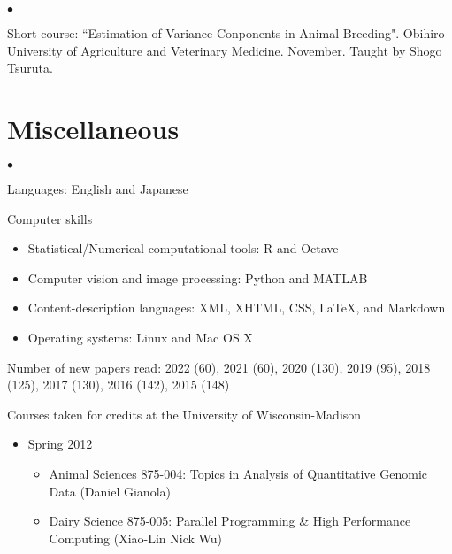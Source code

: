 \documentclass[margin,line,10pt]{res}
\newenvironment{list2}{
  \begin{list}{$\bullet$}{%
      \setlength{\itemsep}{0in}
      \setlength{\parsep}{0in} \setlength{\parskip}{0in}
      \setlength{\topsep}{0in} \setlength{\partopsep}{0in} 
      \setlength{\leftmargin}{0.2in}}}{\end{list}}
\begin{document}
\begin{resume}
\section{}
\begin{list2}
\item Short course: ``Estimation of Variance Conponents in Animal Breeding". Obihiro University of Agriculture and Veterinary Medicine. November. 
Taught by Shogo Tsuruta.  
\end{list2}  



\vspace{0.5cm}
\section{\sc Miscellaneous} 
\begin{list2}

\item Languages: English and Japanese
  \vspace{0.3cm}

\item Computer skills 
  \begin{itemize}
  \item Statistical/Numerical computational tools: R and Octave
  \item Computer vision and image processing: Python and MATLAB
  \item Content-description languages: XML, XHTML, CSS, \LaTeX, and Markdown
  \item Operating systems: Linux and Mac OS X
  \end{itemize}


  \vspace{0.3cm}
\item Number of new papers read: 2022 (60), 2021 (60), 2020 (130), 2019 (95), 2018 (125), 2017 (130), 2016 (142), 2015 (148)


  \vspace{0.3cm}
\item Courses taken for credits at the University of Wisconsin-Madison 
  \begin{itemize}

\item Spring 2012
\begin{itemize}
\item    Animal Sciences 875-004: Topics in Analysis of Quantitative Genomic Data (Daniel Gianola)
\item    Dairy Science 875-005: Parallel Programming \& High Performance Computing (Xiao-Lin Nick Wu)
\end{itemize}



\end{itemize}
\end{list2}
\end{resume}
\end{document}
